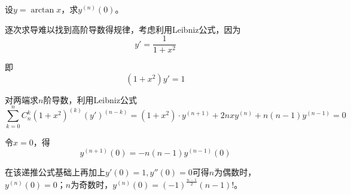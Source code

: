 \begin{problem}[思考题]
	设$y=\arctan{x}$，求$y^{(n)}(0)$。
	
	\begin{solution}
		逐次求导难以找到高阶导数得规律，考虑利用Leibniz公式，因为
		\[y'=\frac{1}{1+x^2}\]
		
		即
		\[(1+x^2)y'=1\]
		
		对两端求$n$阶导数，利用Leibniz公式
		\[\sum^n_{k=0}C^k_n(1+x^2)^{(k)}(y')^{(n-k)}=(1+x^2)\cdot y^{(n+1)}+2nxy^{(n)}+n(n-1)y^{(n-1)}=0\]
		
		令$x=0$，得
		\[y^{(n+1)}(0)=-n(n-1)y^{(n-1)}(0)\]
		
		在该递推公式基础上再加上$y'(0)=1,y''(0)=0$可得$n$为偶数时，$y^{(n)}(0)=0$；$n$为奇数时，$y^{(n)}(0)=(-1)^{\frac{n-1}{2}}(n-1)!$。
	\end{solution}
\end{problem}